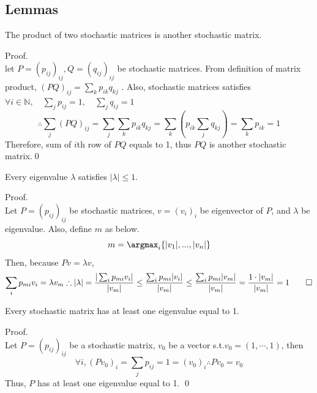 \subsection{Lemmas}
\begin{frame}
    \begin{lemma}
        \label{lemmaA} The product of two stochastic matrices is another stochastic matrix.        
    \end{lemma}  
    Proof.\\
    let $P=(p_{ij}) _{ij}, Q = (q_{ij}) _{ij}$ be stochastic matrices. From definition of matrix product, $(PQ)_{ij} = \sum_{k} p_{ik}q_{kj}$ . 
    Also, stochastic matrices satisfies 
    $\forall i\in\mathbb{N},\quad\sum_{j}  p_{ij} = 1,\quad\sum_{j}  q_{ij} = 1$ 
    \[
    \therefore \sum_{j} (PQ)_{ij}
    = \sum_{j} \sum_{k} p_{ik}q_{kj}
    = \sum_{k} \left(p_{ik}\sum_{j}  q_{kj}\right) = \sum_{k} p_{ik} = 1
    \]
    Therefore, sum of  $i$th row of $PQ$ equals to 1, thus $PQ$ is another stochastic matrix.\qed
\end{frame}

\begin{frame}
    \begin{lemma}
        \label{lemmaB} Every eigenvalue $\lambda$ satisfies 
        $|\lambda|\le1$.
    \end{lemma}
    Proof. \\
        Let $P=(p_{ij}) _{ij}$ be stochastic matrices, $v = (v_i)_i$ be eigenvector of $P$, and $\lambda$ be eigenvalue.
        Also, define $m$ as below.
        $$
        m = \argmax_{i} \{|v_1|,...,|v_n|\} 
        $$
        Then, because $Pv = \lambda v$, 
        \[
        \sum_i p_{mi} v_i = \lambda v_m \\
        \therefore |\lambda |
        = \frac{|\sum_i p_{mi} v_i |}{|v_m|} 
        \le \frac{\sum_i p_{mi} |v_i|}{|v_m|}
        \le \frac{\sum_i p_{mi} |v_m|}{|v_m|}
        = \frac{1\cdot |v_m|}{|v_m|} = 1 \qed
        \]
\end{frame}

\begin{frame}
    \begin{lemma}
        \label{lemmaC} Every stochastic matrix has at least one eigenvalue equal to 1.
    \end{lemma}  
    Proof.\\
    Let $P=(p_{ij}) _{ij}$ be a stochastic matrix, $v_0$ be a vector s.t.$ v_0 = (1,\cdots,1)$, then
    \[
    \forall i, (Pv_0)_i = \sum_j p_{ij} = 1 = (v_0)_i
    \therefore Pv_0 = v_0
    \]
    Thus, $P$ has at least one eigenvalue equal to 1. \qed
\end{frame}